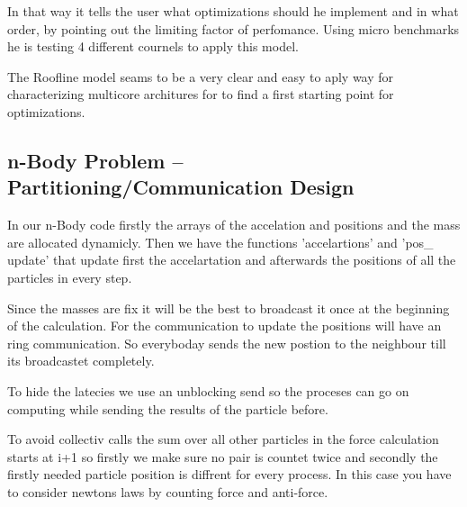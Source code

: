 \documentclass[a4paper,11pt]{scrartcl}
\begin{document}
In that way it tells the user what optimizations should he implement and in what order, by pointing out the limiting factor of perfomance.
Using micro benchmarks he is testing 4 different cournels to apply this model.

The Roofline model seams to be a very clear and easy to aply way for characterizing multicore architures for to find a first starting point for optimizations.
 \subsection{n-Body Problem – Partitioning/Communication Design}
In our n-Body code firstly the arrays of the accelation and positions and the mass are allocated dynamicly.
Then we have the functions 'accelartions' and 'pos\_ update' that update first the accelartation and afterwards the positions of all the particles in every step.

Since the masses are fix it will be the best to broadcast it once at the beginning of the calculation. For the communication to update the positions will have an ring communication. So everyboday sends the new postion to the neighbour till its broadcastet completely.

To hide the latecies we use an unblocking send so the proceses can go on computing while sending the results of the particle before.
 
To avoid collectiv calls the sum over all other particles in the force calculation starts at i+1 so firstly we make sure no pair is countet twice and secondly the firstly needed particle position is diffrent for every process. In this case you have to consider newtons laws by counting force and anti-force.
\end{document}

